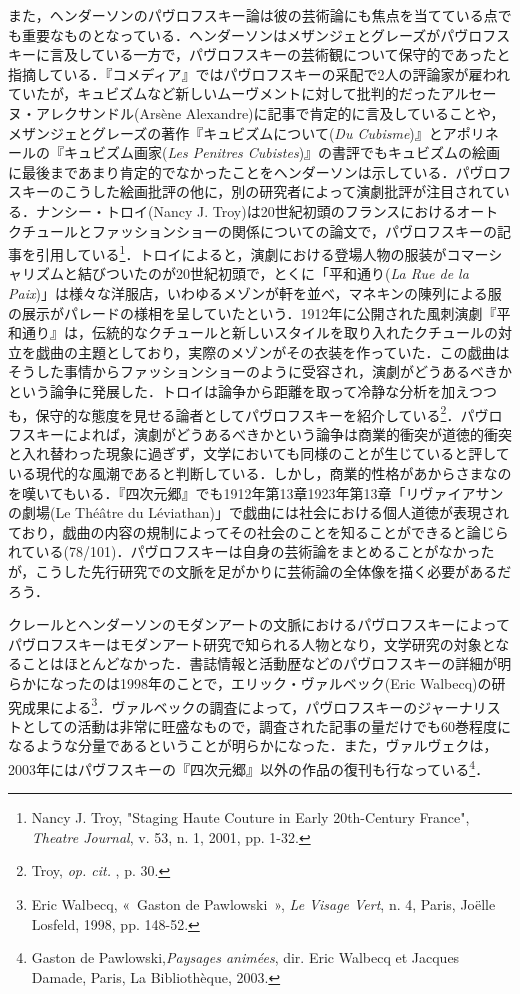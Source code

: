 また，ヘンダーソンのパヴロフスキー論は彼の芸術論にも焦点を当てている点でも重要なものとなっている．ヘンダーソンはメザンジェとグレーズがパヴロフスキーに言及している一方で，パヴロフスキーの芸術観について保守的であったと指摘している．『コメディア』ではパヴロフスキーの采配で2人の評論家が雇われていたが，キュビズムなど新しいムーヴメントに対して批判的だったアルセーヌ・アレクサンドル(Arsène Alexandre)に記事で肯定的に言及していることや，メザンジェとグレーズの著作『キュビズムについて(\emph{Du Cubisme})』とアポリネールの『キュビズム画家(\emph{Les Penitres Cubistes})』の書評でもキュビズムの絵画に最後まであまり肯定的でなかったことをヘンダーソンは示している．パヴロフスキーのこうした絵画批評の他に，別の研究者によって演劇批評が注目されている．ナンシー・トロイ(Nancy J. Troy)は20世紀初頭のフランスにおけるオートクチュールとファッションショーの関係についての論文で，パヴロフスキーの記事を引用している\footnote{Nancy J. Troy, "Staging Haute Couture in Early 20th-Century France", \emph{Theatre Journal}, v. 53, n. 1, 2001, pp. 1-32.}．トロイによると，演劇における登場人物の服装がコマーシャリズムと結びついたのが20世紀初頭で，とくに「平和通り(\emph{La Rue de la Paix})」は様々な洋服店，いわゆるメゾンが軒を並べ，マネキンの陳列による服の展示がパレードの様相を呈していたという．1912年に公開された風刺演劇『平和通り』は，伝統的なクチュールと新しいスタイルを取り入れたクチュールの対立を戯曲の主題としており，実際のメゾンがその衣装を作っていた．この戯曲はそうした事情からファッションショーのように受容され，演劇がどうあるべきかという論争に発展した．トロイは論争から距離を取って冷静な分析を加えつつも，保守的な態度を見せる論者としてパヴロフスキーを紹介している\footnote{Troy, \emph{op. cit. }, p. 30.}．パヴロフスキーによれば，演劇がどうあるべきかという論争は商業的衝突が道徳的衝突と入れ替わった現象に過ぎず，文学においても同様のことが生じていると評している現代的な風潮であると判断している．しかし，商業的性格があからさまなのを嘆いてもいる．『四次元郷』でも1912年第13章1923年第13章「リヴァイアサンの劇場(Le Théâtre du Léviathan)」で戯曲には社会における個人道徳が表現されており，戯曲の内容の規制によってその社会のことを知ることができると論じられている(78/101)．パヴロフスキーは自身の芸術論をまとめることがなかったが，こうした先行研究での文脈を足がかりに芸術論の全体像を描く必要があるだろう．

クレールとヘンダーソンのモダンアートの文脈におけるパヴロフスキーによってパヴロフスキーはモダンアート研究で知られる人物となり，文学研究の対象となることはほとんどなかった．書誌情報と活動歴などのパヴロフスキーの詳細が明らかになったのは1998年のことで，エリック・ヴァルベック(Eric Walbecq)の研究成果による\footnote{Eric Walbecq, «~Gaston de Pawlowski~», \emph{Le Visage Vert}, n. 4, Paris, Joëlle Losfeld, 1998, pp. 148-52.}．ヴァルベックの調査によって，パヴロフスキーのジャーナリストとしての活動は非常に旺盛なもので，調査された記事の量だけでも60巻程度になるような分量であるということが明らかになった．また，ヴァルヴェクは，2003年にはパヴフスキーの『四次元郷』以外の作品の復刊も行なっている\footnote{Gaston de Pawlowski,\emph{Paysages animées}, dir. Eric Walbecq et Jacques Damade, Paris, La Bibliothèque, 2003.}．

